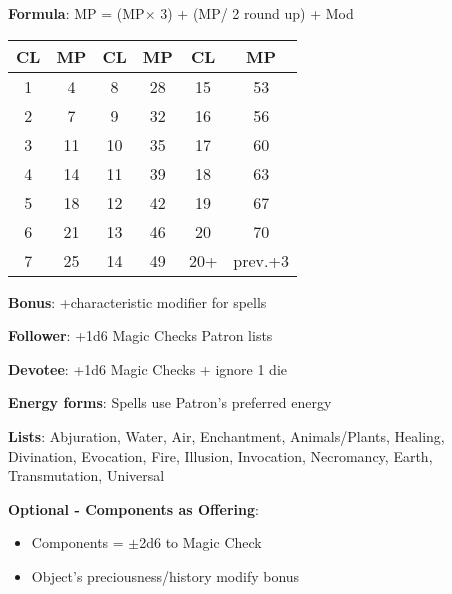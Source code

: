 \documentclass[10pt,a4paper,landscape]{article}
\begin{document}
	\begin{multicols}{2}
		
		\begin{tcolorbox}[title=UPDATED MAGIC POINTS TABLE]
			\textbf{Formula}: MP = (MP$\times$ 3) + (MP/ 2 round up) + Mod
			
			\begin{tabular}{cc|cc|cc}
				\textbf{CL} & \textbf{MP} & \textbf{CL} & \textbf{MP} & \textbf{CL} & \textbf{MP} \\
				\midrule
				1 & 4 & 8 & 28 & 15 & 53 \\
				2 & 7 & 9 & 32 & 16 & 56 \\
				3 & 11 & 10 & 35 & 17 & 60 \\
				4 & 14 & 11 & 39 & 18 & 63 \\
				5 & 18 & 12 & 42 & 19 & 67 \\
				6 & 21 & 13 & 46 & 20 & 70 \\
				7 & 25 & 14 & 49 & 20+ & prev.+3 \\
			\end{tabular}
			
			\textbf{Bonus}: +characteristic modifier for spells
		\end{tcolorbox}
		
		\begin{tcolorbox}[title=PRIVILEGED MAGIC LISTS]
			\textbf{Follower}: +1d6 Magic Checks Patron lists
			
			\textbf{Devotee}: +1d6 Magic Checks + ignore 1 die
			
			\textbf{Energy forms}: Spells use Patron's preferred energy
			
			\textbf{Lists}: Abjuration, Water, Air, Enchantment, Animals/Plants, Healing, Divination, Evocation, Fire, Illusion, Invocation, Necromancy, Earth, Transmutation, Universal
			
			\medskip
			
			\textbf{Optional - Components as Offering}:
			\begin{itemize}[leftmargin=*,noitemsep]
				\item Components = $\pm$2d6 to Magic Check
				\item Object's preciousness/history modify bonus
			\end{itemize}
		\end{tcolorbox}
		
	\end{multicols}
	
\end{document}

